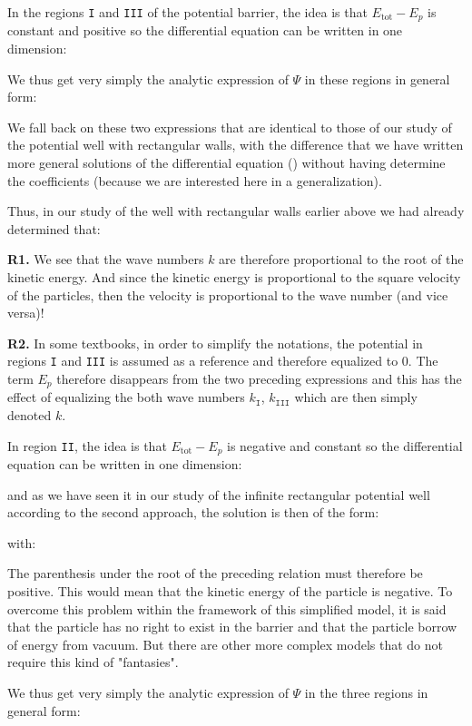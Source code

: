 	In the regions \texttt{I} and \texttt{III} of the potential barrier, the idea is that $E_{\text{tot}}-E_p$ is constant and positive so the differential equation can be written in one dimension:
	
	We thus get very simply the analytic expression of $\Psi$ in these regions in general form:
	
	We fall back on these two expressions that are identical to those of our study of the potential well with rectangular walls, with the difference that we have written more general solutions of the differential equation () without having determine the coefficients (because we are interested here in a generalization).

	Thus, in our study of the well with rectangular walls earlier above we had already determined that:
	
	\begin{tcolorbox}[title=Remarks,colframe=black,arc=10pt]
	\textbf{R1.} We see that the wave numbers $k$ are therefore proportional to the root of the kinetic energy. And since the kinetic energy is proportional to the square velocity of the particles, then the velocity is proportional to the wave number (and vice versa)!

	\textbf{R2.} In some textbooks, in order to simplify the notations, the potential in regions \texttt{I} and \texttt{III} is assumed as a reference and therefore equalized to $0$. The term $E_p$ therefore disappears from the two preceding expressions and this has the effect of equalizing the both wave numbers $k_{\texttt{I}}$, $k_{\texttt{III}}$ which are then simply denoted $k$.
	\end{tcolorbox}
	In region \texttt{II}, the idea is that $E_{\text{tot}}-E_p$ is negative and constant so the differential equation can be written in one dimension:
	
	and as we have seen it in our study of the infinite rectangular potential well according to the second approach, the solution is then of the form:
	
	with:
	
	\begin{tcolorbox}[title=Remark,colframe=black,arc=10pt]
	The parenthesis under the root of the preceding relation must therefore be positive. This would mean that the kinetic energy of the particle is negative. To overcome this problem within the framework of this simplified model, it is said that the particle has no right to exist in the barrier and that the particle borrow of energy from vacuum. But there are other more complex models that do not require this kind of "fantasies".
	\end{tcolorbox}
	We thus get very simply the analytic expression of $\Psi$ in the three regions in general form:
	
